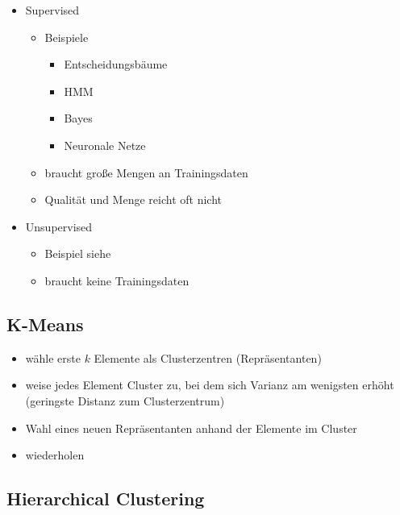 \documentclass[nonacm=true, language=german]{acmart}
\begin{document}
\begin{itemize}
    \item Supervised
    \begin{itemize}
        \item Beispiele
        \begin{itemize}
            \item Entscheidungsbäume
            \item HMM
            \item Bayes
            \item Neuronale Netze
        \end{itemize}
        
        \item braucht große Mengen an Trainingsdaten
        \item Qualität und Menge reicht oft nicht
    \end{itemize}
    
    \item Unsupervised
    \begin{itemize}
        \item Beispiel siehe 
        \item braucht keine Trainingsdaten
    \end{itemize}
\end{itemize}

\newpage
\subsection{K-Means}

\begin{itemize}
    \item wähle erste $k$ Elemente als Clusterzentren (Repräsentanten)
    \item weise jedes Element Cluster zu, bei dem sich Varianz am wenigsten erhöht (geringste Distanz zum Clusterzentrum)
    \item Wahl eines neuen Repräsentanten anhand der Elemente im Cluster
    \item wiederholen
\end{itemize}

\subsection{Hierarchical Clustering}
\end{document}

